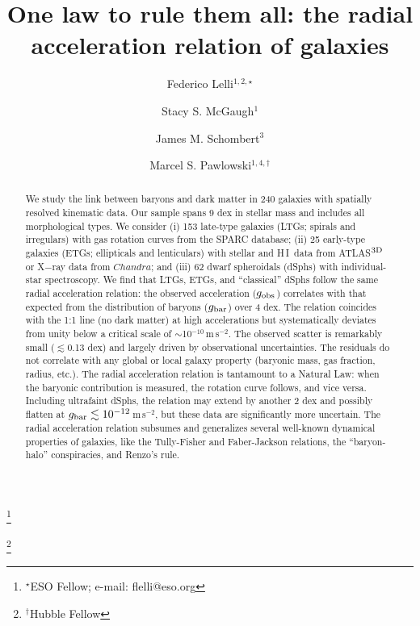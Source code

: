 \documentclass[apjl, twocolappendix]{emulateapj}
\newcommand{\hi } {{\rm H}\,{\small\rm I} \,}
\begin{document}
\nocite{*}
\title{One law to rule them all: the radial acceleration relation of galaxies}
\author{Federico Lelli$^{1, 2,\star}$}\thanks{$^{\star}$ESO Fellow; e-mail: flelli@eso.org}
\author{Stacy S. McGaugh$^{1}$} 
\author{James M. Schombert$^{3}$}
\author{Marcel S. Pawlowski$^{1,4,\dag}$}\thanks{$^{\dag}$Hubble Fellow}
\begin{abstract}
We study the link between baryons and dark matter in 240 galaxies with spatially resolved kinematic data. Our sample spans 9 dex in stellar mass and includes all morphological types. We consider (i) 153 late-type galaxies (LTGs; spirals and irregulars) with gas rotation curves from the SPARC database; (ii) 25 early-type galaxies (ETGs; ellipticals and lenticulars) with stellar and \hi data from ATLAS$^{\rm 3D}$ or X$-$ray data from $Chandra$; and (iii) 62 dwarf spheroidals (dSphs) with individual-star spectroscopy. We find that LTGs, ETGs, and ``classical'' dSphs follow the same radial acceleration relation: the observed acceleration ($g_{\rm obs}$) correlates with that expected from the distribution of baryons ($g_{\rm bar}$) over 4 dex. The relation coincides with the 1:1 line (no dark matter) at high accelerations but systematically deviates from unity below a critical scale of $\sim$10$^{-10}$\,m\,s$^{-2}$. The observed scatter is remarkably small ($\lesssim$0.13 dex) and largely driven by observational uncertainties. The residuals do not correlate with any global or local galaxy property (baryonic mass, gas fraction, radius, etc.). The radial acceleration relation is tantamount to a Natural Law: when the baryonic contribution is measured, the rotation curve follows, and vice versa. Including ultrafaint dSphs, the relation may extend by another 2 dex and possibly flatten at $g_{\rm bar}\lesssim10^{-12}$\,m\,s$^{-2}$, but these data are significantly more uncertain. The radial acceleration relation subsumes and generalizes several well-known dynamical properties of galaxies, like the Tully-Fisher and Faber-Jackson relations, the ``baryon-halo'' conspiracies, and Renzo's rule.
\end{abstract}
\end{document}
